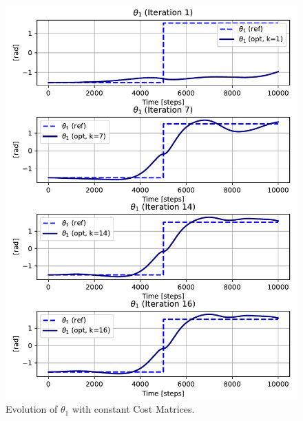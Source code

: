 \begin{figure}[htb]
    \centering
    \includegraphics[width=1\linewidth]{img/1-Task1/th1_const.pdf}
    \caption{Evolution of $\theta_1$ with constant Cost Matrices.}
    \label{fig:th1const}
\end{figure}

